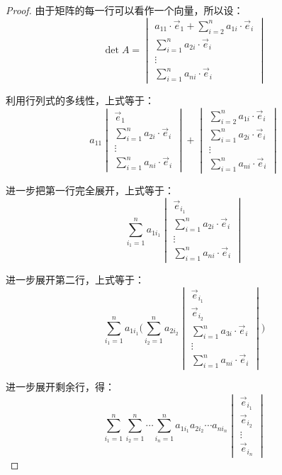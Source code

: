 \begin{proof}
	由于矩阵的每一行可以看作一个向量，所以设：
	$$
	\det A =
	\begin{vmatrix}
		a_{11} \cdot \vec e_1 + \sum\limits_{i = 2}^n a_{1i} \cdot \vec e_i
		\\
		\sum\limits_{i = 1}^n a_{2i} \cdot \vec e_i
		\\
		\vdots
		\\
		\sum\limits_{i = 1}^n a_{ni} \cdot \vec e_i
	\end{vmatrix}
	$$

	利用行列式的多线性，上式等于：
	$$
	a_{11} \begin{vmatrix} \vec e_1 \\ \sum\limits_{i = 1}^n a_{2i} \cdot \vec e_i \\ \vdots \\ \sum\limits_{i = 1}^n a_{ni} \cdot \vec e_i \end{vmatrix} + \begin{vmatrix} \sum\limits_{i = 2}^n a_{1i} \cdot \vec e_i \\ \sum\limits_{i = 1}^n a_{2i} \cdot \vec e_i \\ \vdots \\ \sum\limits_{i = 1}^n a_{ni} \cdot \vec e_i \end{vmatrix}
	$$

	进一步把第一行完全展开，上式等于：
	$$
	\sum\limits_{i_1 = 1}^n a_{1 i_1} \begin{vmatrix} \vec e_{i_1} \\ \sum\limits_{i = 1}^n a_{2i} \cdot \vec e_i \\ \vdots \\ \sum\limits_{i = 1}^n a_{ni} \cdot \vec e_i \end{vmatrix}
	$$

	进一步展开第二行，上式等于：
	$$
	\sum\limits_{i_1 = 1}^n a_{1 i_1} \Biggl( \sum\limits_{i_2 = 1}^n a_{2 i_2} \begin{vmatrix} \vec e_{i_1} \\ \vec e_{i_2} \\ \sum\limits_{i = 1}^n a_{3i} \cdot \vec e_i \\ \vdots \\ \sum\limits_{i = 1}^n a_{ni} \cdot \vec e_i \end{vmatrix} \Biggr)
	$$

	进一步展开剩余行，得：
	$$
	\sum\limits_{i_1 = 1}^n \sum\limits_{i_2 = 1}^n \cdots \sum\limits_{i_n = 1}^n a_{1 i_1} a_{2 i_2} \cdots a_{n i_n} \begin{vmatrix} \vec e_{i_1} \\ \vec e_{i_2} \\ \vdots \\ \vec e_{i_n} \end{vmatrix}
	$$


\end{proof}
